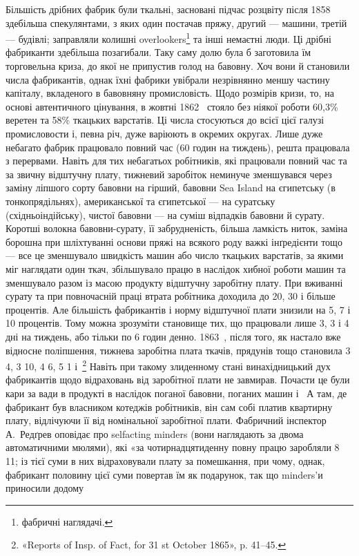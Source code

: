 \parcont{}  %
Більшість дрібних фабрик були ткальні, засновані підчас розцвіту
після 1858~ здебільша спекулянтами, з яких один постачав
пряжу, другий — машини, третій — будівлі; заправляли колишні
overlookers\footnote*{
фабричні наглядачі. 
} та інші немаєтні люди. Ці дрібні фабриканти здебільша
позагибали. Таку саму долю була б заготовила їм торговельна
криза, до якої не припустив голод на бавовну. Хоч вони
й становили  числа фабрикантів, однак їхні фабрики увібрали
незрівнянно меншу частину капіталу, вкладеного в бавовняну промисловість.
Щодо розмірів кризи, то, на основі автентичного
цінування, в жовтні 1862~ стояло без ніякої роботи 60,3\%
веретен та 58\% ткацьких варстатів. Ці числа стосуються до всієї
цієї галузі промисловости і, певна річ, дуже варіюють в окремих
округах. Лише дуже небагато фабрик працювало повний час (60 годин на тиждень),
решта працювала з перервами. Навіть
для тих небагатьох робітників, які працювали повний час
та за звичну відштучну плату, тижневий заробіток неминуче зменшувався
через заміну ліпшого сорту бавовни на гірший, бавовни
Sea Island на єгипетську (в тонкопрядільнях), американської та
єгипетської — на суратську (східньоіндійську), чистої бавовни —
на суміш відпадків бавовни й сурату. Коротші волокна бавовни-сурату,
її забрудненість, більша ламкість ниток, заміна борошна
при шліхтуванні основи пряжі на всякого роду важкі інґредієнти
тощо — все це зменшувало швидкість машин або число ткацьких
варстатів, за якими міг наглядати один ткач, збільшувало працю
в наслідок хибної роботи машин та зменшувало разом із масою
продукту відштучну заробітну плату. При вживанні сурату та
при повночасній праці втрата робітника доходила до 20, 30 і
більше процентів. Але більшість фабрикантів і норму відштучної
плати знизили на 5, 7 і 10 процентів. Тому можна зрозуміти
становище тих, що працювали лише 3, 3 і 4 дні на тиждень,
або тільки по 6 годин денно. 1863~, після того, як настало вже
відносне поліпшення, тижнева заробітна плата ткачів, прядунів
тощо становила 3 4, 3 10, 4
6, 5 1 і~\footnote{
«Reports of Insp. of Fact, for 31 st October 1865», p. 41--45.
} Навіть при такому злиденному
стані винахідницький дух фабрикантів щодо відраховань
від заробітної плати не завмирав. Почасти це були кари за вади
в продукті в наслідок поганої бавовни, поганих машин і~
А там, де фабрикант був власником котеджів робітників, він сам
собі платив квартирну плату, відлічуючи її від номінальної
заробітної плати. Фабричний інспектор А.~Редґрев оповідає
про selfacting minders (вони наглядають за двома автоматичними
мюлями), які «за чотирнадцятиденну повну працю заробляли
8 11; із тієї суми в них відраховували плату за
помешкання, при чому, однак, фабрикант половину цієї суми
повертав їм як подарунок, так що minders’и приносили додому
\parbreak{}  %
